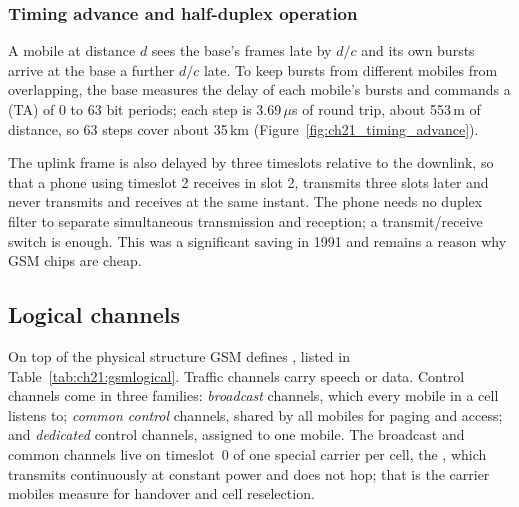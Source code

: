 \subsubsection{Timing advance and half-duplex operation}

A mobile at distance $d$ sees the base's frames late by $d/c$ and its own bursts arrive at the base
a further $d/c$ late. To keep bursts from different mobiles from overlapping, the base measures the
delay of each mobile's bursts and commands a  (TA) of 0 to 63 bit periods; each
step is 3.69\,$\mu$s of round trip, about 553\,m of distance, so 63 steps cover about 35\,km
(Figure~\ref{fig:ch21_timing_advance}).


The uplink frame is also delayed by three timeslots relative to the downlink, so that a phone using
timeslot 2 receives in slot 2, transmits three slots later and never transmits and receives at the
same instant. The phone needs no duplex filter to separate simultaneous transmission and reception;
a transmit/receive switch is enough. This was a significant saving in 1991 and remains a reason why
GSM chips are cheap.

\subsection{Logical channels}

On top of the physical structure GSM defines , listed in
Table~\ref{tab:ch21:gsmlogical}. Traffic channels carry speech or data. Control channels come in
three families: \emph{broadcast} channels, which every mobile in a cell listens to; \emph{common
control} channels, shared by all mobiles for paging and access; and \emph{dedicated} control
channels, assigned to one mobile. The broadcast and common channels live on timeslot~0 of one
special carrier per cell, the , which transmits continuously at constant power
and does not hop; that is the carrier mobiles measure for handover and cell reselection.

